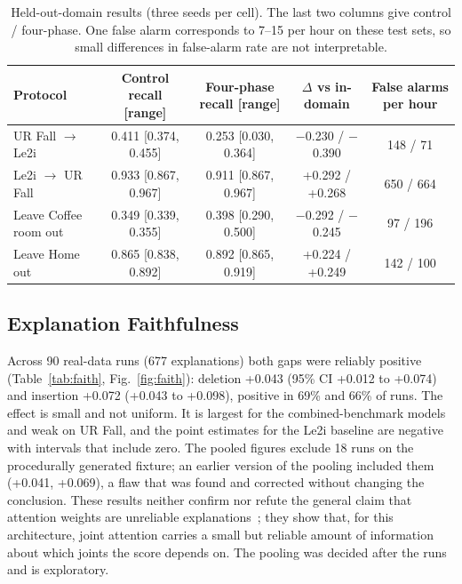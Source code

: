 \documentclass[journal]{IEEEtran}
\begin{document}
\begin{table}[!t]
\renewcommand{\arraystretch}{1.15}
\caption{Held-out-domain results (three seeds per cell). The last two columns give control / four-phase. One false alarm corresponds to 7--15 per hour on these test sets, so small differences in false-alarm rate are not interpretable.}
\label{tab:heldout}
\centering
\footnotesize
\begin{tabular}{lcccc}
\hline
Protocol & Control recall [range] & Four-phase recall [range] & $\Delta$ vs in-domain & False alarms per hour \\
\hline
UR Fall $\rightarrow$ Le2i & 0.411 [0.374, 0.455] & 0.253 [0.030, 0.364] & $-$0.230 / $-$0.390 & 148 / 71 \\
Le2i $\rightarrow$ UR Fall & 0.933 [0.867, 0.967] & 0.911 [0.867, 0.967] & +0.292 / +0.268 & 650 / 664 \\
Leave Coffee room out & 0.349 [0.339, 0.355] & 0.398 [0.290, 0.500] & $-$0.292 / $-$0.245 & 97 / 196 \\
Leave Home out & 0.865 [0.838, 0.892] & 0.892 [0.865, 0.919] & +0.224 / +0.249 & 142 / 100 \\
\hline
\end{tabular}
\end{table}


\subsection{Explanation Faithfulness}\label{sub:faithres}

Across 90 real-data runs (677 explanations) both gaps were reliably positive (Table~\ref{tab:faith}, Fig.~\ref{fig:faith}): deletion +0.043 (95\% CI +0.012 to +0.074) and insertion +0.072 (+0.043 to +0.098), positive in 69\% and 66\% of runs. The effect is small and not uniform. It is largest for the combined-benchmark models and weak on UR Fall, and the point estimates for the Le2i baseline are negative with intervals that include zero. The pooled figures exclude 18 runs on the procedurally generated fixture; an earlier version of the pooling included them (+0.041, +0.069), a flaw that was found and corrected without changing the conclusion. These results neither confirm nor refute the general claim that attention weights are unreliable explanations~\cite{jain}; they show that, for this architecture, joint attention carries a small but reliable amount of information about which joints the score depends on. The pooling was decided after the runs and is exploratory.
\end{document}
